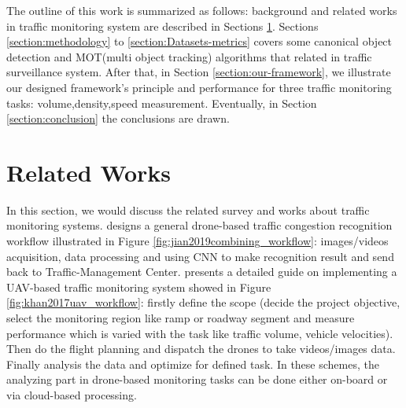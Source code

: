 \documentclass[10pt,twocolumn,letterpaper]{article}  %
\begin{document}
The outline of this work is summarized as follows:
background and related works in traffic monitoring system are described in Sections \ref{section:related-work}. Sections \ref{section:methodology} to \ref{section:Datasets-metrics} covers some canonical object detection and MOT(multi object tracking) algorithms that related in traffic surveillance system. After that, in Section \ref{section:our-framework}, we illustrate our designed framework's principle and performance for three traffic monitoring tasks: volume,density,speed measurement. Eventually, in Section \ref{section:conclusion} the conclusions are drawn.





\section{Related Works}
\label{section:related-work}
In this section, we would discuss the related survey and works about traffic monitoring systems. \cite{jian2019combining} designs a general drone-based traffic congestion recognition workflow illustrated in Figure \ref{fig:jian2019combining_workflow}: images/videos acquisition, data processing and using CNN to make recognition result and send back to Traffic-Management Center.
\cite{khan2017uav} presents a detailed guide on implementing a UAV-based traffic monitoring system showed in Figure \ref{fig:khan2017uav_workflow}: firstly define the scope (decide the project objective, select the monitoring region like ramp or roadway segment and measure performance which is varied with the task like traffic volume, vehicle velocities). Then do the flight planning and dispatch the drones to take videos/images data. Finally analysis the data and optimize for defined task. In these schemes, the analyzing part in drone-based monitoring tasks can be done either on-board or via cloud-based processing.
\end{document}
